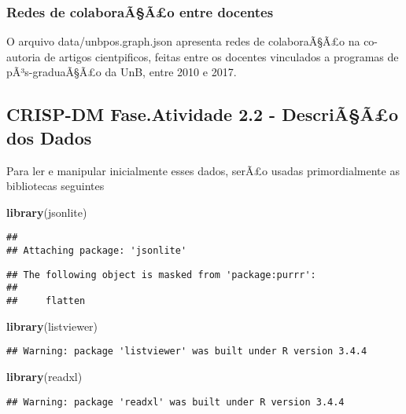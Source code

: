 \documentclass[]{article}
\newenvironment{Shaded}{\begin{snugshade}}{\end{snugshade}}
\newcommand{\KeywordTok}[1]{\textcolor[rgb]{0.13,0.29,0.53}{\textbf{#1}}}
\newcommand{\NormalTok}[1]{#1}
\begin{document}
\subsubsection{Redes de colaboraÃ§Ã£o entre
docentes}\label{redes-de-colaboraaao-entre-docentes}

O arquivo data/unbpos.graph.json apresenta redes de colaboraÃ§Ã£o na
co-autoria de artigos cientpificos, feitas entre os docentes vinculados
a programas de pÃ³s-graduaÃ§Ã£o da UnB, entre 2010 e 2017.

\subsection{CRISP-DM Fase.Atividade 2.2 - DescriÃ§Ã£o dos
Dados}\label{crisp-dm-fase.atividade-2.2---descriaao-dos-dados}

Para ler e manipular inicialmente esses dados, serÃ£o usadas
primordialmente as bibliotecas seguintes

\begin{Shaded}
\begin{Highlighting}[]
\KeywordTok{library}\NormalTok{(jsonlite)}
\end{Highlighting}
\end{Shaded}

\begin{verbatim}
## 
## Attaching package: 'jsonlite'
\end{verbatim}

\begin{verbatim}
## The following object is masked from 'package:purrr':
## 
##     flatten
\end{verbatim}

\begin{Shaded}
\begin{Highlighting}[]
\KeywordTok{library}\NormalTok{(listviewer)}
\end{Highlighting}
\end{Shaded}

\begin{verbatim}
## Warning: package 'listviewer' was built under R version 3.4.4
\end{verbatim}

\begin{Shaded}
\begin{Highlighting}[]
\KeywordTok{library}\NormalTok{(readxl)}
\end{Highlighting}
\end{Shaded}

\begin{verbatim}
## Warning: package 'readxl' was built under R version 3.4.4
\end{verbatim}
\end{document}

